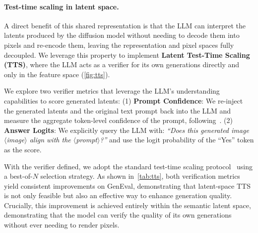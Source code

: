 \documentclass[10pt,twocolumn,letterpaper]{article}
\begin{document}
\paragraph{Test-time scaling in latent space.}
A direct benefit of this shared representation is that the LLM can interpret the latents produced by the diffusion model without needing to decode them into pixels and re-encode them, leaving the representation and pixel spaces fully decoupled. We leverage this property to implement \textbf{Latent Test-Time Scaling (TTS)}, where the LLM acts as a verifier for its own generations directly and only in the feature space (\cref{fig:tts}).

We explore two verifier metrics that leverage the LLM's understanding capabilities to score generated latents:
(1) \textbf{Prompt Confidence}: We re-inject the generated latents and the original text prompt back into the LLM and measure the aggregate token-level confidence of the prompt, following~\citet{kang2025scalable}.
(2) \textbf{Answer Logits}: We explicitly query the LLM with: \textit{``Does this generated image $\langle$image$\rangle$ align with the $\langle$prompt$\rangle$?''} and use the logit probability of the ``Yes'' token as the score.

With the verifier defined, we adopt the standard test-time scaling protocol~\citep{ma2025inference, xie2025sana} using a best-of-$N$ selection strategy. As shown in~\cref{tab:tts}, both verification metrics yield consistent improvements on GenEval, demonstrating that latent-space TTS is not only feasible but also an effective way to enhance generation quality.
Crucially, this improvement is achieved entirely within the semantic latent space, demonstrating that the model can verify the quality of its own generations without ever needing to render pixels.
\end{document}
